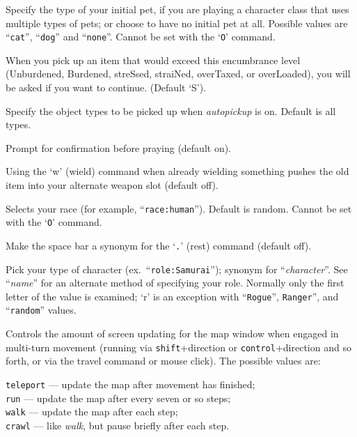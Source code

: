 \item[\ib{pettype}]
Specify the type of your initial pet, if you are playing a character class
that uses multiple types of pets; or choose to have no initial pet at all.
Possible values are ``{\tt cat}'', ``{\tt dog}'' and ``{\tt none}''.
Cannot be set with the `{\tt O}' command.
\item[\ib{pickup\_burden}]
When you pick up an item that would exceed this encumbrance
level (Unburdened, Burdened, streSsed, straiNed, overTaxed,
or overLoaded), you will be asked if you want to continue.
(Default `S').
\item[\ib{pickup\_types}]
Specify the object types to be picked up when {\it autopickup\/}
is on.  Default is all types.
\item[\ib{prayconfirm}]
Prompt for confirmation before praying (default on).
\item[\ib{pushweapon}]
Using the `w' (wield) command when already wielding
something pushes the old item into your alternate weapon slot (default off).
\item[\ib{race}]
Selects your race (for example, ``{\tt race:human}'').  Default is random.
Cannot be set with the `{\tt O}' command.
\item[\ib{rest\_on\_space}]
Make the space bar a synonym for the `{\tt .}' (rest) command (default off).
\item[\ib{role}]
Pick your type of character (ex.\ ``{\tt role:Samurai}'');
synonym for ``{\it character\/}''.  See ``{\it name\/}'' for an alternate method
of specifying your role.  Normally only the first letter of the
value is examined; `r' is an exception with ``{\tt Rogue}'', {\tt Ranger}'',
and ``{\tt random}'' values.
\item[\ib{runmode}]
Controls the amount of screen updating for the map window when engaged
in multi-turn movement (running via {\tt shift}+direction
or {\tt control}+direction
and so forth, or via the travel command or mouse click).
The possible values are:

{\tt teleport} --- update the map after movement has finished;\\
{\tt run} --- update the map after every seven or so steps;\\
{\tt walk} --- update the map after each step;\\
{\tt crawl} --- like {\it walk\/}, but pause briefly after each step.

